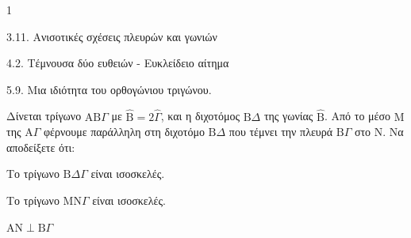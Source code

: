 \begin{ylh}{1}
    \item 3.11. Ανισοτικές σχέσεις πλευρών και γωνιών
    \item 4.2. Τέμνουσα δύο ευθειών - Ευκλείδειο αίτημα
    \item 5.9. Μια ιδιότητα του ορθογώνιου τριγώνου.
\end{ylh}
Δίνεται τρίγωνο $\mathrm{A}\mathrm{B}\Gamma$ με $\hat{\mathrm{B}} = 2\hat{\Gamma}$, και η διχοτόμος $\mathrm{B}\Delta$ της γωνίας $\hat{\mathrm{B}}$. Από το μέσο $\mathrm{M}$ της $\mathrm{A}\Gamma$ φέρνουμε παράλληλη στη διχοτόμο $\mathrm{B}\Delta$ που τέμνει την πλευρά $\mathrm{B}\Gamma$ στο $\mathrm{N}$.
Να αποδείξετε ότι:
\begin{alist}
    \item Το τρίγωνο $\mathrm{B}\Delta\Gamma$ είναι ισοσκελές. 
    \item Το τρίγωνο $\mathrm{M}\mathrm{N}\Gamma$ είναι ισοσκελές. 
    \item $\mathrm{A}\mathrm{N} \perp \mathrm{B}\Gamma$ 
\end{alist}
